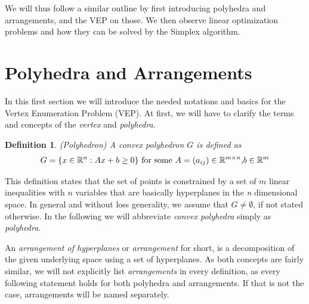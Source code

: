 \documentclass[a4paper, 11pt]{article}
\newtheorem{mydef}{Definition}
\begin{document}
We will thus follow a similar outline by first introducing polyhedra and arrangements, and the VEP on those. We then observe linear optimization problems and how they can be solved by the Simplex algorithm.

\section{Polyhedra and Arrangements}
In this first section we will introduce the needed notations and basics for the Vertex Enumeration Problem (VEP). At first, we will have to clarify the terms and concepts of the \textit{vertex} and \textit{polyhedra}.

\begin{mydef}(Polyhedron)\medskip
	A \textit{convex polyhedron} $G$ is defined as
	\begin{equation}
		G = \{ x\in \mathbb{R}^n: Ax+b\geq 0 \}\text{
			for some }A=(a_{ij}) \in \mathbb{R}^{m\times n}\text, b \in \mathbb{R}^m
	\end{equation}
\end{mydef}

This definition states that the set of points is constrained by a set of $m$ linear inequalities with $n$ variables that are basically hyperplanes in the \textit{n} dimensional space. In general and without loss generality, we assume that $G\neq\emptyset$, if not stated otherwise. In the following we will abbreviate \textit{convex polyhedra} simply as \textit{polyhedra}. \medskip

An \textit{arrangement of hyperplanes} or \textit{arrangement} for short, is a decomposition of the given underlying space using a set of hyperplanes. As both concepts are fairly similar, we will not explicitly list \textit{arrangements} in every definition, as every following statement holds for both polyhedra and arrangements. If that is not the case, arrangements will be named separately.\medskip
\end{document}
